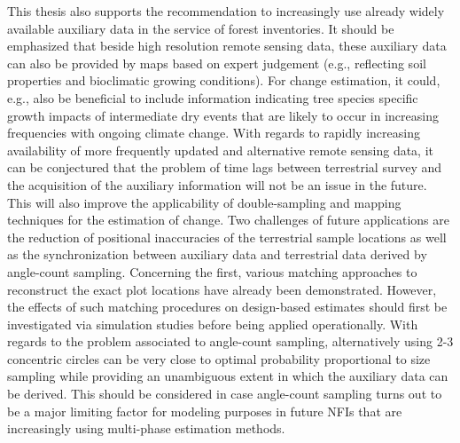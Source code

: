 This thesis also supports the recommendation to increasingly use already widely available auxiliary data in the service of forest inventories. It should be emphasized that beside high resolution remote sensing data, these auxiliary data can also be provided by maps based on expert judgement (e.g., reflecting soil properties and bioclimatic growing conditions). For change estimation, it could, e.g., also be beneficial to include information indicating tree species specific growth impacts of intermediate dry events that are likely to occur in increasing frequencies with ongoing climate change. With regards to rapidly increasing availability of more frequently updated and alternative remote sensing data, it can be conjectured that the problem of time lags between terrestrial survey and the acquisition of the auxiliary information will not be an issue in the future. This will also improve the applicability of double-sampling and mapping techniques for the estimation of change. Two challenges of future applications are the reduction of positional inaccuracies of the terrestrial sample locations as well as the synchronization between auxiliary data and terrestrial data derived by angle-count sampling. Concerning the first, various matching approaches to reconstruct the exact plot locations have already been demonstrated. However, the effects of such matching procedures on design-based estimates should first be investigated via simulation studies before being applied operationally. With regards to the problem associated to angle-count sampling, alternatively using 2-3 concentric circles can be very close to optimal probability proportional to size sampling \citep{mandallaz2008} while providing an unambiguous extent in which the auxiliary data can be derived. This should be considered in case angle-count sampling turns out to be a major limiting factor for modeling purposes in future NFIs that are increasingly using multi-phase estimation methods.\par
 
